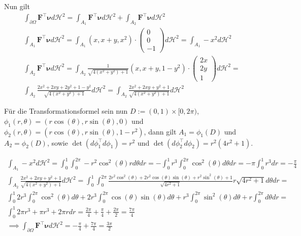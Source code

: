 \documentclass[]{article}
\begin{document}
Nun gilt
\begin{align*}
	\int_{\partial\Omega} \bm{F}^\top \bm{\nu} d\mathcal{H}^2 = \int_{A_1} \bm{F}^\top \bm{\nu} d\mathcal{H}^2 + \int_{A_2} \bm{F}^\top \bm{\nu} d\mathcal{H}^2\\
	\int_{A_1} \bm{F}^\top \bm{\nu} d\mathcal{H}^2 = \int_{A_1} (x, x+y, x^2)\cdot \begin{pmatrix}0\\ 0\\ -1\end{pmatrix} d\mathcal{H}^2 = \int_{A_1} -x^2 d\mathcal{H}^2\\
	\int_{A_2} \bm{F}^\top \bm{\nu} d\mathcal{H}^2 = \int_{A_2} \frac{1}{\sqrt{4(x^2+y^2)+1}} (x, x+y, 1-y^2)\cdot \begin{pmatrix}2x\\ 2y\\ 1\end{pmatrix} d\mathcal{H}^2 =\\
	\int_{A_2} \frac{2x^2 + 2xy + 2y^2 + 1 - y^2}{\sqrt{4(x^2+y^2)+1}} d\mathcal{H}^2 = \int_{A_2} \frac{2x^2 + 2xy + y^2 + 1}{\sqrt{4(x^2+y^2)+1}} d\mathcal{H}^2
\end{align*}

Für die Transformationsformel sein nun $D:=(0,1)\times[0,2\pi)$, $\phi_1(r, \theta)=(r\cos(\theta), r\sin(\theta), 0)$ und $\phi_2(r, \theta)=(r\cos(\theta), r\sin(\theta), 1-r^2)$, dann gilt $A_1=\phi_1(D)$ und $A_2=\phi_2(D)$, sowie $\det(d\phi_1^\top d\phi_1) = r^2$ und $\det(d\phi_2^\top d\phi_2) = r^2(4r^2+1)$.

\begin{align*}
	\int_{A_1} -x^2 d\mathcal{H}^2 = \int_{0}^{1} \int_{0}^{2\pi} -r^2 \cos^2(\theta) r d\theta dr = -\int_{0}^{1} r^3 \int_{0}^{2\pi} \cos^2(\theta) d\theta dr = -\pi \int_{0}^{1} r^3 dr = -\frac{\pi}{4}\\
	\int_{A_2} \frac{2x^2 + 2xy + y^2 + 1}{\sqrt{4(x^2+y^2)+1}} d\mathcal{H}^2 = \int_{0}^{1}\int_{0}^{2\pi} \frac{2r^2\cos^2(\theta)+2r^2\cos(\theta)\sin(\theta)+r^2\sin^2(\theta)+1}{\sqrt{4r^2 + 1}} r\sqrt{4r^2+1} d\theta dr =\\
	\int_{0}^{1} 2r^3 \int_{0}^{2\pi} \cos^2(\theta) d\theta + 2r^3 \int_{0}^{2\pi} \cos(\theta)\sin(\theta) d\theta + r^3 \int_{0}^{2\pi} \sin^2(\theta) d\theta + r \int_{0}^{2\pi} d\theta dr =\\
	\int_{0}^{1} 2\pi r^3 + \pi r^3 + 2\pi r dr = \frac{2\pi}{4} + \frac{\pi}{4} + \frac{2\pi}{2} = \frac{7\pi}{4}\\
	\implies \int_{\partial\Omega} \bm{F}^\top \bm{\nu} d\mathcal{H}^2 = -\frac{\pi}{4} + \frac{7\pi}{4} = \frac{3\pi}{2}
\end{align*}
\newpage
\end{document}
